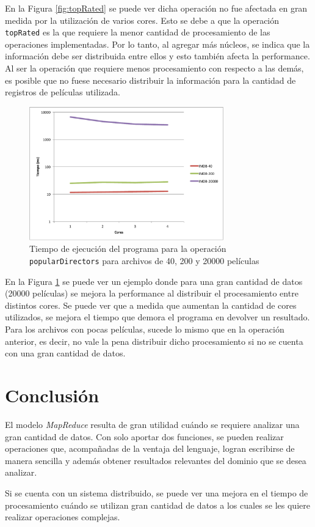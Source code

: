 \documentclass[a4paper,11pt]{article}
\begin{document}
En la Figura \ref{fig:topRated} se puede ver dicha operación no fue afectada en gran medida por la utilización de varios cores. Esto se debe a que la operación \texttt{topRated} es la que requiere la menor cantidad de procesamiento de las operaciones implementadas. Por lo tanto, al agregar más núcleos, se indica que la información debe ser distribuida entre ellos y esto también afecta la performance. Al ser la operación que requiere menos procesamiento con respecto a las demás, es posible que no fuese necesario distribuir la información para la cantidad de registros de películas utilizada.

\begin{figure}[H]
    \centering
    \includegraphics[width=0.75\textwidth]{images/popularDir.pdf}
    \caption{Tiempo de ejecución del programa para la operación \texttt{popularDirectors} para archivos de 40, 200 y 20000 películas}
    \label{fig:popDir}
\end{figure}

En la Figura \ref{fig:popDir} se puede ver un ejemplo donde para una gran cantidad de datos (20000 películas) se mejora la performance al distribuir el procesamiento entre distintos cores. Se puede ver que a medida que aumentan la cantidad de cores utilizados, se mejora el tiempo que demora el programa en devolver un resultado. Para los archivos con pocas películas, sucede lo mismo que en la operación anterior, es decir, no vale la pena distribuir dicho procesamiento si no se cuenta con una gran cantidad de datos.

\section{Conclusión}

El modelo \textit{MapReduce} resulta de gran utilidad cuándo se requiere analizar una gran cantidad de datos. Con solo aportar dos funciones, se pueden realizar operaciones que, acompañadas de la ventaja del lenguaje, logran escribirse de manera sencilla y además obtener resultados relevantes del dominio que se desea analizar.

Si se cuenta con un sistema distribuido, se puede ver una mejora en el tiempo de procesamiento cuándo se utilizan gran cantidad de datos a los cuales se les quiere realizar operaciones complejas.



\end{document}
